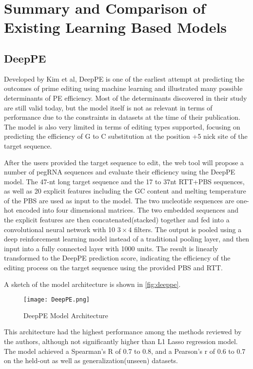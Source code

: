 \chapter{Summary and Comparison of Existing Learning Based Models}

\label{appendix:models}

\section{DeepPE}

Developed by Kim et al, DeepPE is one of the earliest attempt at predicting the outcomes of prime editing using machine learning and illustrated many possible determinants of PE efficiency. Most of the determinants discovered in their study are still valid today, but the model itself is not as relevant in terms of performance due to the constraints in datasets at the time of their publication. The model is also very limited in terms of editing types supported, focusing on predicting the efficiency of G to C substitution at the position +5 nick site of the target sequence. 

After the users provided the target sequence to edit, the web tool will propose a number of pegRNA sequences and evaluate their efficiency using the DeepPE model. The 47-nt long target sequence and the 17 to 37nt RTT+PBS sequences, as well as 20 explicit features including the GC content and melting temperature of the PBS are used as input to the model. The two nucleotide sequences are one-hot encoded into four dimensional matrices. The two embedded sequences and the explicit features are then concatenated(stacked) together and fed into a convolutional neural network with 10 $3 \times 4$ filters. The output is pooled using a deep reinforcement learning model instead of a traditional pooling layer, and then input into a fully connected layer with 1000 units. The result is linearly transformed to the DeepPE prediction score, indicating the efficiency of the editing process on the target sequence using the provided PBS and RTT.

A sketch of the model architecture is shown in \autoref{fig:deeppe}.

\begin{figure}[ht]
    \centering
    \texttt{[image: DeepPE.png]}
    \caption{DeepPE Model Architecture}
    \label{fig:deeppe}
\end{figure}

This architecture had the highest performance among the methods reviewed by the authors, although not significantly higher than L1 Lasso regression model. The model achieved a Spearman's R of 0.7 to 0.8, and a Pearson's r of 0.6 to 0.7 on the held-out as well as generalization(unseen) datasets.

